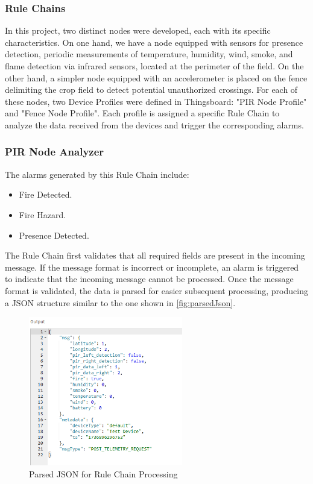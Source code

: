 \subsubsection*{Rule Chains}
In this project, two distinct nodes were developed, each with its specific characteristics. On one hand, we have a node equipped with sensors for presence detection, 
periodic measurements of temperature, humidity, wind, smoke, and flame detection via infrared sensors, located at the perimeter of the field. On the other hand, a 
simpler node equipped with an accelerometer is placed on the fence delimiting the crop field to detect potential unauthorized crossings. For each of these nodes,
two Device Profiles were defined in Thingsboard: "PIR Node Profile" and "Fence Node Profile". Each profile is assigned a specific Rule Chain to analyze the data 
received from the devices and trigger the corresponding alarms.


\subsubsection*{PIR Node Analyzer}
The alarms generated by this Rule Chain include:
\begin{itemize}
    \item Fire Detected.
    \item Fire Hazard.
    \item Presence Detected.
\end{itemize}

The Rule Chain first validates that all required fields are present in the incoming message. If the message format is incorrect or incomplete, an alarm is triggered 
to indicate that the incoming message cannot be processed. Once the message format is validated, the data is parsed for easier subsequent processing, producing a JSON
structure similar to the one shown in \autoref{fig:parsedJson}.

\begin{figure}[H]
    \centering
    \includegraphics[width=0.6\textwidth]{./images/8/jsonParsed.PNG}
    \caption{Parsed JSON for Rule Chain Processing}
    \label{fig:parsedJson}
\end{figure}

